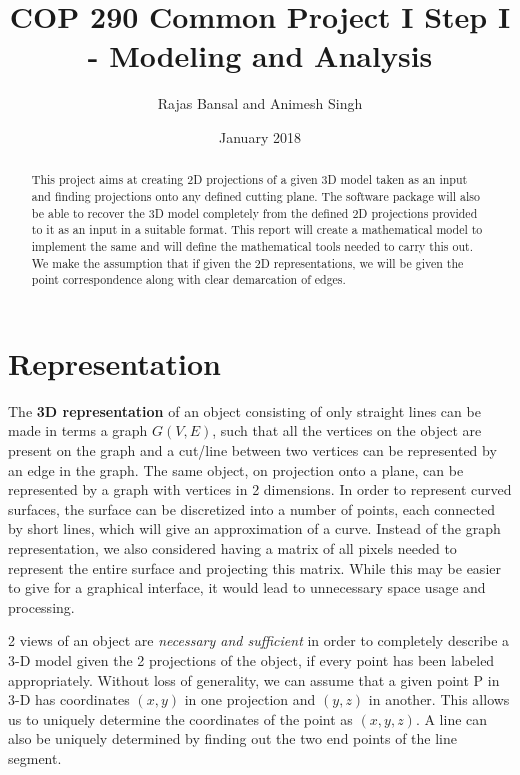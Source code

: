 \documentclass{article}
\title{\textbf{COP 290 Common Project I}
\linebreak Step I - Modeling and Analysis}
\author{Rajas Bansal and Animesh Singh}
\date{January 2018}
\begin{document}
\maketitle 

\begin{abstract}
    This project aims at creating 2D projections of a given 3D model taken as an input and finding projections onto any defined cutting plane. The software package will also be able to recover the 3D model completely from the defined 2D projections provided to it as an input in a suitable format. This report will create a mathematical model to implement the same and will define the mathematical tools needed to carry this out. We make the assumption that if given the 2D representations, we will be given the point correspondence along with clear demarcation of edges. 
\end{abstract}
\section{Representation}
The \textbf{3D representation} of an object consisting of only straight lines can be made in terms a graph $G (V,E)$, such that all the vertices on the object are present on the graph and a cut/line between two vertices can be represented by an edge in the graph. The same object, on projection onto a plane, can be represented by a graph with vertices in 2 dimensions. In order to represent curved surfaces, the surface can be discretized into a number of points, each connected by short lines, which will give an approximation of a curve. Instead of the graph representation, we also considered having a matrix of all pixels needed to represent the entire surface and projecting this matrix. While this may be easier to give for a graphical interface, it would lead to unnecessary space usage and processing.\par
2 views of an object are \emph{necessary and sufficient} in order to completely describe a 3-D model given the 2 projections of the object, if every point has been labeled appropriately. Without loss of generality, we can assume that a given point P in 3-D has coordinates $(x,y)$ in one projection and $(y,z)$ in another. This allows us to uniquely determine the coordinates of the point as $(x,y,z)$. A line can also be uniquely determined by finding out the two end points of the line segment. 
\end{document}
